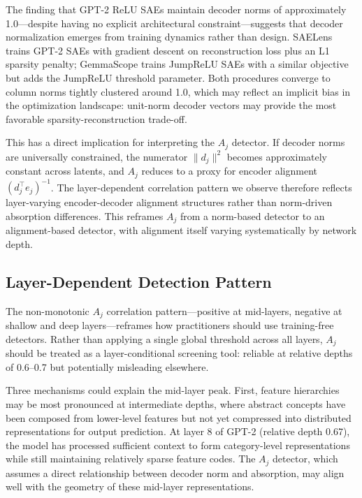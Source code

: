 \documentclass{article}
\begin{document}
The finding that GPT-2 ReLU SAEs maintain decoder norms of approximately 1.0---despite having no explicit architectural constraint---suggests that decoder normalization emerges from training dynamics rather than design. SAELens trains GPT-2 SAEs with gradient descent on reconstruction loss plus an L1 sparsity penalty; GemmaScope trains JumpReLU SAEs with a similar objective but adds the JumpReLU threshold parameter. Both procedures converge to column norms tightly clustered around 1.0, which may reflect an implicit bias in the optimization landscape: unit-norm decoder vectors may provide the most favorable sparsity-reconstruction trade-off.

This has a direct implication for interpreting the $A_j$ detector. If decoder norms are universally constrained, the numerator $\|d_j\|^2$ becomes approximately constant across latents, and $A_j$ reduces to a proxy for encoder alignment $(d_j^\top e_j)^{-1}$. The layer-dependent correlation pattern we observe therefore reflects layer-varying encoder-decoder alignment structures rather than norm-driven absorption differences. This reframes $A_j$ from a norm-based detector to an alignment-based detector, with alignment itself varying systematically by network depth.

\subsection{Layer-Dependent Detection Pattern}

The non-monotonic $A_j$ correlation pattern---positive at mid-layers, negative at shallow and deep layers---reframes how practitioners should use training-free detectors. Rather than applying a single global threshold across all layers, $A_j$ should be treated as a layer-conditional screening tool: reliable at relative depths of 0.6--0.7 but potentially misleading elsewhere.

Three mechanisms could explain the mid-layer peak. First, feature hierarchies may be most pronounced at intermediate depths, where abstract concepts have been composed from lower-level features but not yet compressed into distributed representations for output prediction. At layer 8 of GPT-2 (relative depth 0.67), the model has processed sufficient context to form category-level representations while still maintaining relatively sparse feature codes. The $A_j$ detector, which assumes a direct relationship between decoder norm and absorption, may align well with the geometry of these mid-layer representations.
\end{document}
